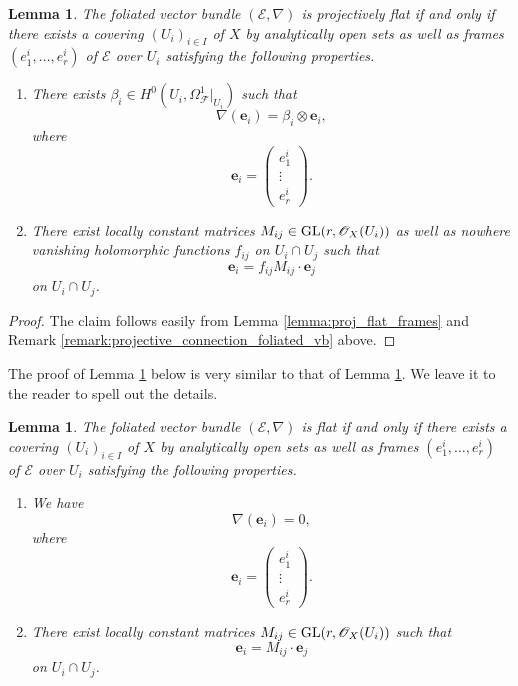 \documentclass[english,10pt]{amsart}
\newcommand{\cF}{\mathcal{F}}
\newcommand{\sE}{\mathscr{E}}
\newcommand{\sO}{\mathscr{O}}
\newtheorem{lemma}[thm]{Lemma}
\theoremstyle{definition}
\theoremstyle{remark}
\numberwithin{equation}{section}
\begin{document}
\begin{lemma}\label{lemma:trans_proj_flat_frames}
The foliated vector bundle $(\sE,\nabla)$ is projectively flat if and only if there exists a covering $(U_i)_{i \in I}$ of $X$ by analytically open sets as well as frames $(e_1^i,\ldots,e_r^i)$ of $\sE$ over $U_i$ satisfying the following properties. 
\begin{enumerate}
\item There exists $\beta_i\in H^0\left(U_i,\Omega_\cF^1|_{U_i}\right)$ such that
\[
\nabla(\textbf{e}_i)=\beta_i\otimes \textbf{e}_i,
\]
where 
\[
\textbf{e}_i = 
\begin{pmatrix}
e_1^i \\
\vdots \\
e_r^i
\end{pmatrix}
.
\]
\item There exist locally constant matrices $M_{ij} \in \textup{GL}(r,\sO_X(U_i))$ as well as nowhere vanishing holomorphic functions $f_{ij}$ on $U_i\cap U_j$ such that 
\[
\textbf{e}_i= f_{ij} M_{ij} \cdot \textbf{e}_j
\]
on $U_i \cap U_j$.
\end{enumerate}
\end{lemma}

\begin{proof}The claim follows easily from Lemma \ref{lemma:proj_flat_frames} and Remark \ref{remark:projective_connection_foliated_vb} above.
\end{proof}

The proof of Lemma \ref{lemma:trans_flat_frames} below is very similar to that of Lemma \ref{lemma:trans_proj_flat_frames}. We leave it to the reader to spell out the details.

\begin{lemma}\label{lemma:trans_flat_frames}
The foliated vector bundle $(\sE,\nabla)$ is flat if and only if there exists a covering $(U_i)_{i \in I}$ of $X$ by analytically open sets as well as frames $(e_1^i,\ldots,e_r^i)$ of $\sE$ over $U_i$ satisfying the following properties. 
\begin{enumerate}
\item We have
\[
\nabla(\textbf{e}_i)=0,
\]
where 
\[
\textbf{e}_i = 
\begin{pmatrix}
e_1^i \\
\vdots \\
e_r^i
\end{pmatrix}
.
\]
\item There exist locally constant matrices $M_{ij} \in \textup{GL}(r,\sO_X(U_i))$ such that 
\[
\textbf{e}_i= M_{ij} \cdot \textbf{e}_j
\]
on $U_i\cap U_j$.
\end{enumerate}
\end{lemma}
\end{document}
